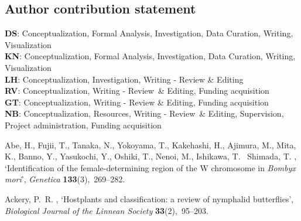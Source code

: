 \documentclass[twocolumn]{bmcart}%
\begin{document}
\begin{backmatter}
\section*{Author contribution statement}%
\textbf{DS}: Conceptualization, Formal Analysis, Investigation, Data Curation, Writing, Visualization \\
\textbf{KN}: Conceptualization, Formal Analysis, Investigation, Data Curation, Writing, Visualization \\
\textbf{LH}: Conceptualization, Investigation, Writing - Review \& Editing \\
\textbf{RV}: Conceptualization, Writing - Review \& Editing, Funding acquisition \\
\textbf{GT}: Conceptualization, Writing - Review \& Editing, Funding acquisition \\
\textbf{NB}: Conceptualization, Resources, Writing - Review \& Editing, Supervision, Project administration, Funding acquisition

%
\begin{thebibliography}{xx}

Abe, H., Fujii, T., Tanaka, N., Yokoyama, T., Kakehashi, H., Ajimura, M., Mita,
  K., Banno, Y., Yasukochi, Y., Oshiki, T., Nenoi, M., Ishikawa, T.
  \harvardand\ Shimada, T.  \harvardyearleft 2008\harvardyearright ,
  `Identification of the female-determining region of the {{W}} chromosome in
  \textit{Bombyx mori}', {\em Genetica} {\bf 133}(3),~269--282.

Ackery, P.~R.  \harvardyearright , `Hostplants and
  classification: a review of nymphalid butterflies', {\em Biological Journal
  of the Linnean Society} {\bf 33}(2),~95--203.


\end{thebibliography}
\end{backmatter}
\end{document}
